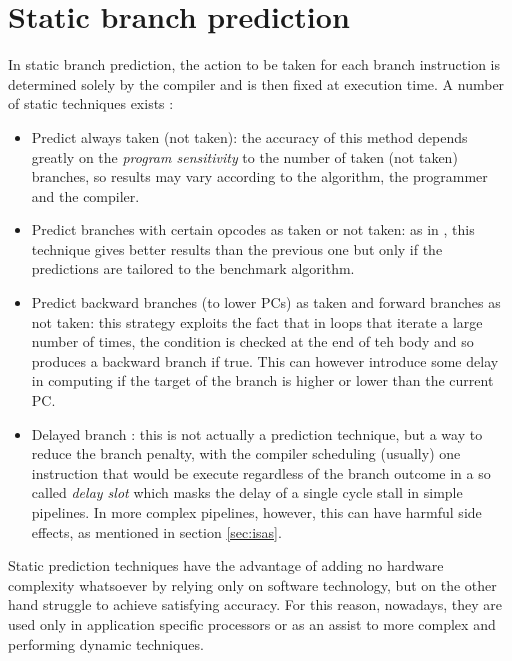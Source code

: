 \section{Static branch prediction}
In static branch prediction, the action to be taken for each branch instruction is determined solely by the compiler and is then fixed at execution time. A number of static techniques exists \cite{smith98}:
\begin{itemize}
  \item Predict always taken (not taken): the accuracy of this method depends greatly on the \emph{program sensitivity} to the number of taken (not taken) branches, so results may vary according to the algorithm, the programmer and the compiler.
  \item Predict branches with certain opcodes as taken or not taken: as in \cite{smith98}, this technique gives better results than the previous one but only if the predictions are tailored to the benchmark algorithm.
  \item Predict backward branches (to lower \acp{PC}) as taken and forward branches as not taken: this strategy exploits the fact that in loops that iterate a large number of times, the condition is checked at the end of teh body and so produces a backward branch if true. This can however introduce some delay in computing if the target of the branch is higher or lower than the current \ac{PC}.
  \item Delayed branch \cite{gross82}: this is not actually a prediction technique, but a way to reduce the branch penalty, with the compiler scheduling (usually) one instruction that would be execute regardless of the branch outcome in a so called \emph{delay slot} which masks the delay of a single cycle stall in simple pipelines. In more complex \ooo pipelines, however, this can have harmful side effects, as mentioned in section \ref{sec:isas}.
\end{itemize}

Static prediction techniques have the advantage of adding no hardware complexity whatsoever by relying only on software technology, but on the other hand struggle to achieve satisfying accuracy. For this reason, nowadays, they are used only in application specific processors or as an assist to more complex and performing dynamic techniques.

